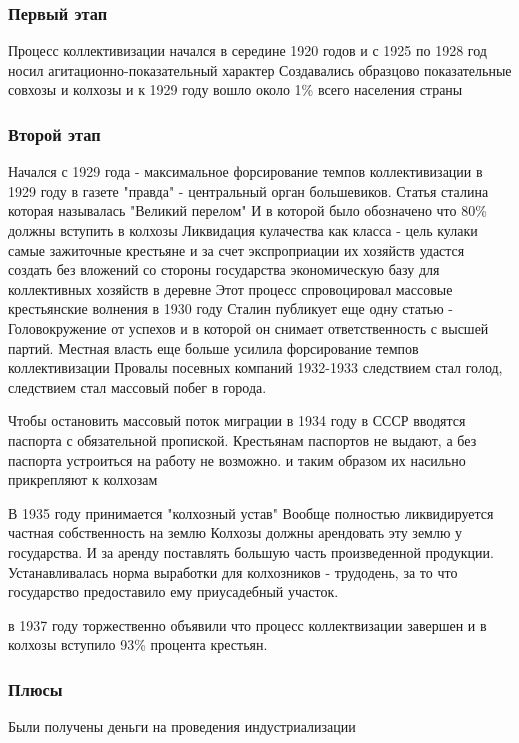\documentclass[a4paper]{article}
\begin{document}
\subsubsection{Первый этап}
Процесс коллективизации начался в середине 1920 годов и с 1925 по 1928 год носил агитационно-показательный характер
Создавались образцово показательные совхозы и колхозы и к 1929 году вошло около 1\% всего населения страны

\subsubsection{Второй этап}
Начался с 1929 года - максимальное форсирование темпов коллективизации
в 1929 году в газете "правда" - центральный орган большевиков. Статья сталина которая называлась "Великий перелом"
И в которой было обозначено что 80\% должны вступить в колхозы
Ликвидация кулачества как класса - цель кулаки самые зажиточные крестьяне и за счет экспроприации их хозяйств удастся создать без вложений со стороны государства экономическую базу для коллективных хозяйств в деревне
Этот процесс спровоцировал массовые крестьянские волнения
в 1930 году Сталин публикует еще одну статью - Головокружение от успехов и в которой он снимает ответственность с высшей партий.
Местная власть еще больше усилила форсирование темпов коллективизации
Провалы посевных компаний 1932-1933 следствием стал голод, следствием стал массовый побег в города.

Чтобы остановить массовый поток миграции в 1934 году в СССР вводятся паспорта с обязательной пропиской. Крестьянам паспортов не выдают, а без паспорта устроиться на работу не возможно. и таким образом их насильно прикрепляют к колхозам

В 1935 году принимается "колхозный устав"
Вообще полностью ликвидируется частная собственность на землю
Колхозы должны арендовать эту землю у государства. И за аренду поставлять большую часть произведенной продукции.
Устанавливалась норма выработки для колхозников - трудодень, за то что государство предоставило ему приусадебный участок.

в 1937 году торжественно объявили что процесс коллектвизации завершен и в колхозы вступило 93\% процента крестьян.

\subsubsection{Плюсы}
Были получены деньги на проведения индустриализации
\end{document}
